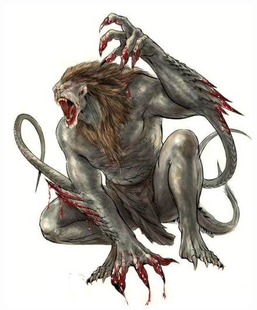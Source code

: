\documentclass[10pt,twoside,twocolumn,openany]{book}
\begin{document}
\begin{figure}

	\vspace{-4.5cm}
	
	\centerline{
		\includegraphics[scale=1]{grendel}
	}
\end{figure}


\clearpage
\end{document}
